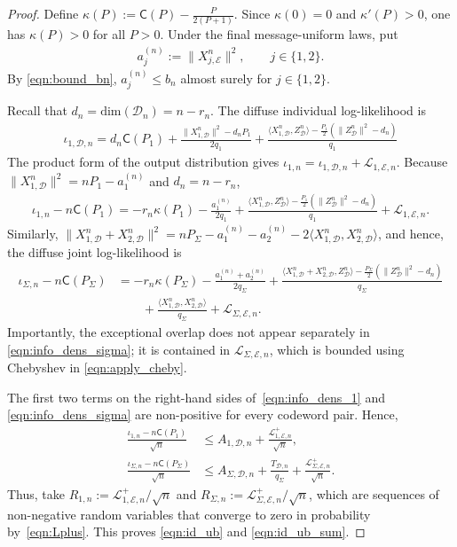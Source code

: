 \documentclass[11pt,onecolumn]{IEEEtran}
\newcommand{\nn}{\nonumber}
\newcommand{\calD}{\mathcal{D}}
\newcommand{\calE}{\mathcal{E}}
\newcommand{\calL}{\mathcal{L}}
\newcommand{\rvC}{\mathsf{C}}
\begin{document}
\begin{proof}
Define $\kappa(P):=\rvC(P)-\frac{P}{2(P+1)}$. Since $\kappa(0)=0 $ and $\kappa'(P)>0$, one has $\kappa(P)>0$ for all $P>0$. Under the final message-uniform  laws, put 
\begin{align}
    a_j^{(n)} := \| X_{j,\calE}^n \|^2,\qquad j \in \{1,2\}.
\end{align}
By \eqref{eqn:bound_bn}, $a_j^{(n)}\le b_n$ almost surely for $j \in \{1,2\}$.

Recall that $d_n=\mathrm{dim}(\calD_n)=n-r_n$. The diffuse individual log-likelihood is 
\begin{align}
    \iota_{1, \calD, n}= d_n \rvC(P_1)+ \frac{\| X_{1,\calD}^n\|^2- d_nP_1}{2q_1} + \frac{\langle X_{1,\calD}^n, Z_{\calD}^n\rangle-\frac{P_1}{2} ( \| Z_{\calD}^n\|^2-d_n) }{q_1}
\end{align}
The product form of the output distribution gives $\iota_{1,n}=\iota_{1, \calD, n}+\calL_{1,\calE,n}$. Because $\|X_{1,\calD}^n\|^2=nP_1-a_1^{(n)}$ and $d_n=n-r_n$,
\begin{align}
    \iota_{1,n}-n\rvC(P_1)=-r_n\kappa(P_1) -\frac{a_1^{(n)}}{2q_1}+\frac{\langle X_{1,\calD}^n, Z_{\calD}^n\rangle-\frac{P_1}{2} ( \| Z_{\calD}^n\|^2-d_n) }{q_1} +\calL_{1,\calE,n}.\label{eqn:info_dens_1}
\end{align}
Similarly, $\|X_{1,\calD}^n+X_{2,\calD}^n\|^2=nP_\Sigma-a_1^{(n)}- a_2^{(n)}-2 \langle X_{1,\calD}^n, X_{2,\calD}^n \rangle$, and hence, the diffuse joint log-likelihood is
\begin{align}
    \iota_{\Sigma,n}-n\rvC(P_\Sigma) &=-r_n\kappa(P_\Sigma) -\frac{a_1^{(n)}+a_2^{(n)}}{2q_\Sigma}+ \frac{\langle X_{1,\calD}^n+X_{2,\calD}^n, Z_{\calD}^n\rangle-\frac{P_\Sigma}{2} ( \| Z_{\calD}^n\|^2-d_n) }{q_\Sigma} \nn\\
    &\qquad+\frac{ \langle X_{1,\calD}^n, X_{2,\calD}^n \rangle}{q_\Sigma} +\calL_{\Sigma,\calE,n}. \label{eqn:info_dens_sigma}
\end{align}
Importantly, the exceptional overlap does not appear separately in \eqref{eqn:info_dens_sigma}; it is contained in $\calL_{\Sigma,\calE,n}$, which is bounded using Chebyshev in \eqref{eqn:apply_cheby}.

The first two terms on the right-hand sides of~\eqref{eqn:info_dens_1} and \eqref{eqn:info_dens_sigma} are non-positive for every codeword pair. Hence, 
\begin{align}
    \frac{\iota_{1,n}-n\rvC(P_1)}{\sqrt{n}} &\le A_{1,\calD,n } +\frac{\calL_{1,\calE,n}^+}{\sqrt{n}},\\
    \frac{\iota_{\Sigma,n}-n\rvC(P_\Sigma)}{\sqrt{n}} &\le A_{\Sigma,\calD,n } +\frac{ T_{\calD,n}}{q_\Sigma} + \frac{\calL_{\Sigma,\calE,n}^+}{\sqrt{n}}.
\end{align}
Thus, take $R_{1,n} := \calL_{1,\calE,n}^+/\sqrt{n}$ and  $R_{\Sigma,n} := \calL_{\Sigma,\calE,n}^+/\sqrt{n}$, which are sequences of non-negative random variables that converge to zero in probability by~\eqref{eqn:Lplus}.  This proves \eqref{eqn:id_ub} and \eqref{eqn:id_ub_sum}.
\end{proof}
\end{document}
